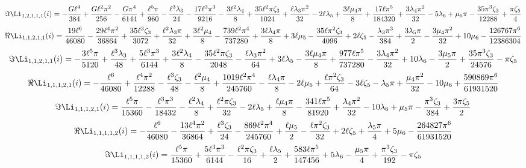 \[
\Im\Li_{1,2,1,1,1}(i) = - \frac{G \ell^{4}}{384} + \frac{G \ell^{2} \pi^{2}}{256} - \frac{G \pi^{4}}{6144} + \frac{\ell^{5} \pi}{960} - \frac{\ell^{3} \lambda_{3}}{24} - \frac{17 \ell^{3} \pi^{3}}{9216} - \frac{3 \ell^{2} \lambda_{4}}{8} + \frac{35 \ell^{2} \pi \zeta_{3}}{1024} + \frac{\ell \lambda_{3} \pi^{2}}{32} - 2 \ell \lambda_{5} + \frac{3 \ell \mu_{4} \pi}{8} + \frac{17 \ell \pi^{5}}{184320} + \frac{3 \lambda_{4} \pi^{2}}{32} - 5 \lambda_{6} + \mu_{5} \pi - \frac{35 \pi^{3} \zeta_{3}}{12288} + \frac{\pi \zeta_{5}}{4}
\]
\[
\Re\Li_{1,1,2,1,1}(i) = \frac{19 \ell^{6}}{46080} - \frac{29 \ell^{4} \pi^{2}}{36864} + \frac{35 \ell^{3} \zeta_{3}}{3072} + \frac{\ell^{2} \lambda_{3} \pi}{32} + \frac{3 \ell^{2} \mu_{4}}{8} - \frac{739 \ell^{2} \pi^{4}}{737280} + \frac{3 \ell \lambda_{4} \pi}{8} + 3 \ell \mu_{5} - \frac{35 \ell \pi^{2} \zeta_{3}}{4096} + 2 \ell \zeta_{5} - \frac{\lambda_{3} \pi^{3}}{384} + \frac{3 \lambda_{5} \pi}{2} - \frac{3 \mu_{4} \pi^{2}}{32} + 10 \mu_{6} - \frac{126767 \pi^{6}}{12386304}
\]
\[
\Im\Li_{1,1,2,1,1}(i) = - \frac{3 \ell^{5} \pi}{5120} + \frac{\ell^{3} \lambda_{3}}{48} + \frac{5 \ell^{3} \pi^{3}}{6144} + \frac{3 \ell^{2} \lambda_{4}}{8} - \frac{35 \ell^{2} \pi \zeta_{3}}{2048} - \frac{\ell \lambda_{3} \pi^{2}}{64} + 3 \ell \lambda_{5} - \frac{3 \ell \mu_{4} \pi}{8} + \frac{977 \ell \pi^{5}}{737280} - \frac{3 \lambda_{4} \pi^{2}}{32} + 10 \lambda_{6} - \frac{3 \mu_{5} \pi}{2} + \frac{35 \pi^{3} \zeta_{3}}{24576} - \pi \zeta_{5}
\]
\[
\Re\Li_{1,1,1,2,1}(i) = - \frac{\ell^{6}}{46080} + \frac{\ell^{4} \pi^{2}}{12288} - \frac{\ell^{3} \zeta_{3}}{48} - \frac{\ell^{2} \mu_{4}}{8} + \frac{1019 \ell^{2} \pi^{4}}{245760} - \frac{\ell \lambda_{4} \pi}{8} - 2 \ell \mu_{5} + \frac{\ell \pi^{2} \zeta_{3}}{64} - 3 \ell \zeta_{5} - \lambda_{5} \pi + \frac{\mu_{4} \pi^{2}}{32} - 10 \mu_{6} + \frac{590869 \pi^{6}}{61931520}
\]
\[
\Im\Li_{1,1,1,2,1}(i) = \frac{\ell^{5} \pi}{15360} - \frac{\ell^{3} \pi^{3}}{18432} - \frac{\ell^{2} \lambda_{4}}{8} + \frac{\ell^{2} \pi \zeta_{3}}{32} - 2 \ell \lambda_{5} + \frac{\ell \mu_{4} \pi}{8} - \frac{341 \ell \pi^{5}}{81920} + \frac{\lambda_{4} \pi^{2}}{32} - 10 \lambda_{6} + \mu_{5} \pi - \frac{\pi^{3} \zeta_{3}}{384} + \frac{3 \pi \zeta_{5}}{2}
\]
\[
\Re\Li_{1,1,1,1,2}(i) = - \frac{\ell^{6}}{46080} - \frac{13 \ell^{4} \pi^{2}}{36864} + \frac{\ell^{3} \zeta_{3}}{24} - \frac{869 \ell^{2} \pi^{4}}{245760} + \frac{\ell \mu_{5}}{2} - \frac{\ell \pi^{2} \zeta_{3}}{32} + 2 \ell \zeta_{5} + \frac{\lambda_{5} \pi}{4} + 5 \mu_{6} - \frac{264827 \pi^{6}}{61931520}
\]
\[
\Im\Li_{1,1,1,1,2}(i) = \frac{\ell^{5} \pi}{15360} + \frac{5 \ell^{3} \pi^{3}}{6144} - \frac{\ell^{2} \pi \zeta_{3}}{16} + \frac{\ell \lambda_{5}}{2} + \frac{583 \ell \pi^{5}}{147456} + 5 \lambda_{6} - \frac{\mu_{5} \pi}{4} + \frac{\pi^{3} \zeta_{3}}{192} - \pi \zeta_{5}
\]
